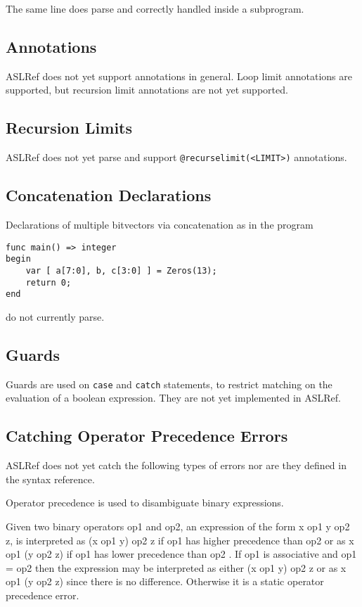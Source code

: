 The same line does parse and correctly handled inside a subprogram.


\subsection{Annotations}
ASLRef does not yet support annotations in general.
Loop limit annotations are supported, but recursion limit annotations are not yet supported.

\subsection{Recursion Limits}
ASLRef does not yet parse and support \texttt{@recurselimit(<LIMIT>)} annotations.

\subsection{Concatenation Declarations}
Declarations of multiple bitvectors via concatenation as in the program
\begin{Verbatim}
func main() => integer
begin
    var [ a[7:0], b, c[3:0] ] = Zeros(13);
    return 0;
end
\end{Verbatim}
do not currently parse.


\subsection{Guards}

Guards are used on \texttt{case} and \texttt{catch} statements, to restrict
matching on the evaluation of a boolean expression.
%
They are not yet implemented in ASLRef.


\subsection{Catching Operator Precedence Errors}
ASLRef does not yet catch the following types of errors nor are they defined in the syntax reference.

Operator precedence is used to disambiguate binary expressions.

Given two binary operators op1 and op2, an expression of the form x op1 y op2 z, is interpreted as (x op1 y) op2 z
if op1 has higher precedence than op2 or as x op1 (y op2 z) if op1 has lower precedence than op2 . If op1 is
associative and op1 = op2 then the expression may be interpreted as either (x op1 y) op2 z or as x op1 (y op2 z)
since there is no difference. Otherwise it is a static operator precedence error.

